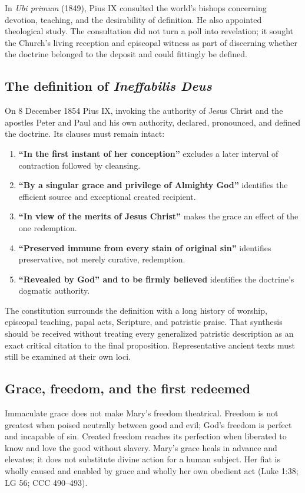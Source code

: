 In \emph{Ubi primum} (1849), Pius IX consulted the world's bishops concerning devotion, teaching, and the desirability of definition. He also appointed theological study. The consultation did not turn a poll into revelation; it sought the Church's living reception and episcopal witness as part of discerning whether the doctrine belonged to the deposit and could fittingly be defined.

\subsection{The definition of \emph{Ineffabilis Deus}}

On 8 December 1854 Pius IX, invoking the authority of Jesus Christ and the apostles Peter and Paul and his own authority, declared, pronounced, and defined the doctrine. Its clauses must remain intact:

\begin{enumerate}
  \item \textbf{``In the first instant of her conception''} excludes a later interval of contraction followed by cleansing.
  \item \textbf{``By a singular grace and privilege of Almighty God''} identifies the efficient source and exceptional created recipient.
  \item \textbf{``In view of the merits of Jesus Christ''} makes the grace an effect of the one redemption.
  \item \textbf{``Preserved immune from every stain of original sin''} identifies preservative, not merely curative, redemption.
  \item \textbf{``Revealed by God'' and to be firmly believed} identifies the doctrine's dogmatic authority.
\end{enumerate}

The constitution surrounds the definition with a long history of worship, episcopal teaching, papal acts, Scripture, and patristic praise. That synthesis should be received without treating every generalized patristic description as an exact critical citation to the final proposition. Representative ancient texts must still be examined at their own loci.

\subsection{Grace, freedom, and the first redeemed}

Immaculate grace does not make Mary's freedom theatrical. Freedom is not greatest when poised neutrally between good and evil; God's freedom is perfect and incapable of sin. Created freedom reaches its perfection when liberated to know and love the good without slavery. Mary's grace heals in advance and elevates; it does not substitute divine action for a human subject. Her fiat is wholly caused and enabled by grace and wholly her own obedient act (Luke 1:38; LG 56; CCC 490--493).

